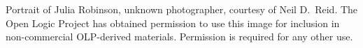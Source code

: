 Portrait of Julia Robinson, unknown photographer, courtesy of Neil
D.~Reid. The Open Logic Project has obtained permission to use this
image for inclusion in non-commercial OLP-derived materials.
Permission is required for any other use.
